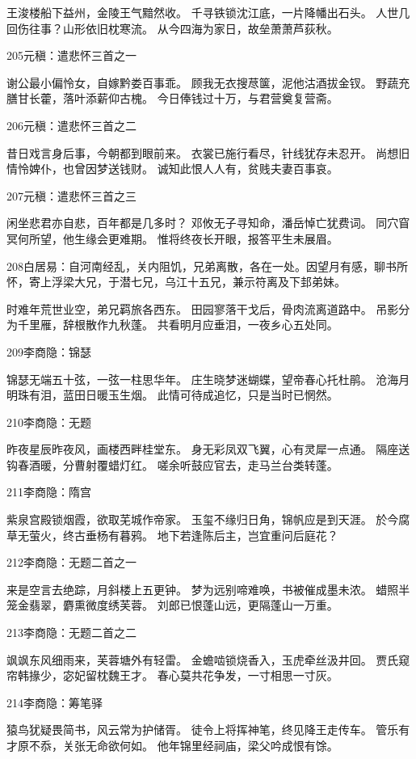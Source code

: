 王浚楼船下益州，金陵王气黯然收。
千寻铁锁沈江底，一片降幡出石头。
人世几回伤往事？山形依旧枕寒流。
从今四海为家日，故垒萧萧芦荻秋。

205元稹：遣悲怀三首之一

谢公最小偏怜女，自嫁黔娄百事乖。
顾我无衣搜荩箧，泥他沽酒拔金钗。
野蔬充膳甘长藿，落叶添薪仰古槐。
今日俸钱过十万，与君营奠复营斋。

206元稹：遣悲怀三首之二

昔日戏言身后事，今朝都到眼前来。
衣裳已施行看尽，针线犹存未忍开。
尚想旧情怜婢仆，也曾因梦送钱财。
诚知此恨人人有，贫贱夫妻百事哀。

207元稹：遣悲怀三首之三

闲坐悲君亦自悲，百年都是几多时？
邓攸无子寻知命，潘岳悼亡犹费词。
同穴窅冥何所望，他生缘会更难期。
惟将终夜长开眼，报答平生未展眉。

208白居易：自河南经乱，关内阻饥，兄弟离散，各在一处。因望月有感，聊书所怀，寄上浮梁大兄，于潜七兄，乌江十五兄，兼示符离及下邽弟妹。

时难年荒世业空，弟兄羁旅各西东。
田园寥落干戈后，骨肉流离道路中。
吊影分为千里雁，辞根散作九秋蓬。
共看明月应垂泪，一夜乡心五处同。

209李商隐：锦瑟

锦瑟无端五十弦，一弦一柱思华年。
庄生晓梦迷蝴蝶，望帝春心托杜鹃。
沧海月明珠有泪，蓝田日暖玉生烟。
此情可待成追忆，只是当时已惘然。

210李商隐：无题

昨夜星辰昨夜风，画楼西畔桂堂东。
身无彩凤双飞翼，心有灵犀一点通。
隔座送钩春酒暖，分曹射覆蜡灯红。
嗟余听鼓应官去，走马兰台类转蓬。

211李商隐：隋宫

紫泉宫殿锁烟霞，欲取芜城作帝家。
玉玺不缘归日角，锦帆应是到天涯。
於今腐草无萤火，终古垂杨有暮鸦。
地下若逢陈后主，岂宜重问后庭花？

212李商隐：无题二首之一

来是空言去绝踪，月斜楼上五更钟。
梦为远别啼难唤，书被催成墨未浓。
蜡照半笼金翡翠，麝熏微度绣芙蓉。
刘郎已恨蓬山远，更隔蓬山一万重。

213李商隐：无题二首之二

飒飒东风细雨来，芙蓉塘外有轻雷。
金蟾啮锁烧香入，玉虎牵丝汲井回。
贾氏窥帘韩掾少，宓妃留枕魏王才。
春心莫共花争发，一寸相思一寸灰。

214李商隐：筹笔驿

猿鸟犹疑畏简书，风云常为护储胥。
徒令上将挥神笔，终见降王走传车。
管乐有才原不忝，关张无命欲何如。
他年锦里经祠庙，梁父吟成恨有馀。

